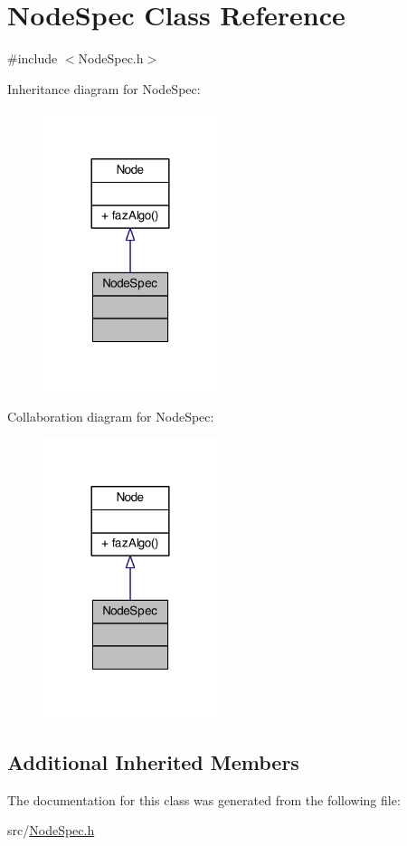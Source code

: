 \hypertarget{class_node_spec}{\section{Node\+Spec Class Reference}
\label{class_node_spec}
}


{\ttfamily \#include $<$Node\+Spec.\+h$>$}



Inheritance diagram for Node\+Spec\+:\nopagebreak
\begin{figure}[H]
\begin{center}
\leavevmode
\includegraphics[width=144pt]{class_node_spec__inherit__graph}
\end{center}
\end{figure}


Collaboration diagram for Node\+Spec\+:\nopagebreak
\begin{figure}[H]
\begin{center}
\leavevmode
\includegraphics[width=144pt]{class_node_spec__coll__graph}
\end{center}
\end{figure}
\subsection*{Additional Inherited Members}


The documentation for this class was generated from the following file\+:\begin{DoxyCompactItemize}
\item 
src/\hyperlink{_node_spec_8h}{Node\+Spec.\+h}\end{DoxyCompactItemize}
